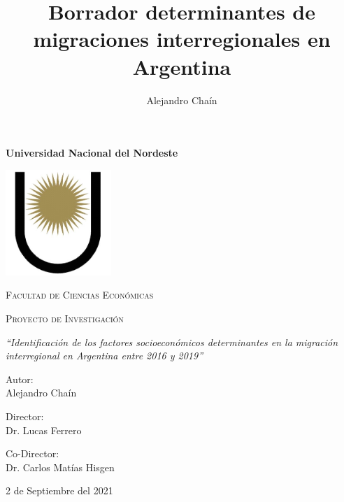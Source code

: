 \documentclass[12pt,a4paper]{article}
\author{Alejandro Chaín}
\title{Borrador determinantes de migraciones interregionales en Argentina}
\begin{document}
\begin{titlepage}
\centering
\vspace{3cm}
{\bfseries\LARGE Universidad Nacional del Nordeste\par}
\vspace{1cm}
{\includegraphics[width=0.3\textwidth]{logounne.png}\par}
{\scshape\Large Facultad de Ciencias Econ\'omicas\par}
\vspace{2cm}
{\scshape\Huge Proyecto de Investigación \par}
\vspace{2cm}
{\itshape\Large ``Identificación de los factores socioeconómicos determinantes en la migración
interregional en Argentina entre 2016 y 2019'' \par}
\vfill

{\large Autor:\\ Alejandro Chaín\par}
{\large Director: \\ Dr. Lucas Ferrero\par}
{\large Co-Director: \\ Dr. Carlos Matías Hisgen\par}

\vfill
{\Large 2 de Septiembre del 2021 \par}
\end{titlepage}
\end{document}
